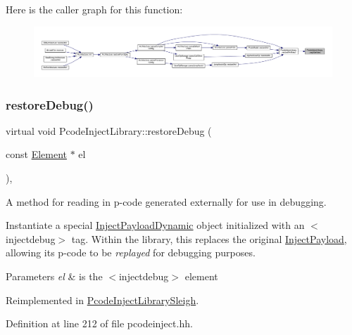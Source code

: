 Here is the caller graph for this function\+:
\nopagebreak
\begin{figure}[H]
\begin{center}
\leavevmode
\includegraphics[width=350pt]{class_pcode_inject_library_a0b75b562fb736f23269114fec5ca36d9_icgraph}
\end{center}
\end{figure}
\mbox{\label{class_pcode_inject_library_a48cebdddd48a1fa5db300d80ed6bdaa2}} 
\subsubsection{\texorpdfstring{restoreDebug()}{restoreDebug()}}
{\footnotesize\ttfamily virtual void Pcode\+Inject\+Library\+::restore\+Debug (\begin{DoxyParamCaption}\item[{const \mbox{\hyperlink{class_element}{Element}} $\ast$}]{el }\end{DoxyParamCaption})\hspace{0.3cm}{\ttfamily [inline]}, {\ttfamily [virtual]}}



A method for reading in p-\/code generated externally for use in debugging. 

Instantiate a special \mbox{\hyperlink{class_inject_payload_dynamic}{Inject\+Payload\+Dynamic}} object initialized with an $<$injectdebug$>$ tag. Within the library, this replaces the original \mbox{\hyperlink{class_inject_payload}{Inject\+Payload}}, allowing its p-\/code to be {\itshape replayed} for debugging purposes. 
\begin{DoxyParams}{Parameters}
{\em el} & is the $<$injectdebug$>$ element \\
\hline
\end{DoxyParams}


Reimplemented in \mbox{\hyperlink{class_pcode_inject_library_sleigh_a121a82e796311b4d5b163cdf773e2235}{Pcode\+Inject\+Library\+Sleigh}}.



Definition at line 212 of file pcodeinject.\+hh.

